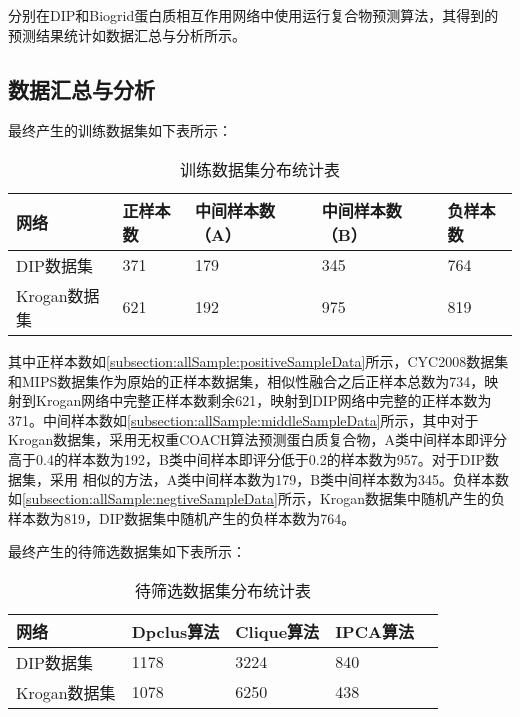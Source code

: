 分别在DIP和Biogrid蛋白质相互作用网络中使用运行复合物预测算法，其得到的预测结果统计如数据汇总与分析所示。




\subsection{数据汇总与分析}
\label{subsection:allSample:summary}

最终产生的训练数据集如下表所示：

\begin{table}[h]
    \centering
    \caption{训练数据集分布统计表}
    \label{tab:datasets:statistic:train}
    \begin{tabular}{C{3cm}C{2cm}C{3cm}C{3cm}C{2cm}}
        \toprule
        \textbf{网络} & \textbf{正样本数} & \textbf{中间样本数（A）} & \textbf{中间样本数（B）} & \textbf{负样本数} \\
        \midrule
        DIP数据集     & 371               & 179                      & 345                      & 764               \\
        Krogan数据集  & 621               & 192                      & 975                      & 819               \\

        \bottomrule
    \end{tabular}
\end{table}
其中正样本数如\ref{subsection:allSample:positiveSampleData}所示，CYC2008数据集和MIPS数据集作为原始的正样本数据集，相似性融合之后正样本总数为734，映射到Krogan网络中完整正样本数剩余621，映射到DIP网络中完整的正样本数为371。中间样本数如\ref{subsection:allSample:middleSampleData}所示，其中对于Krogan数据集，采用无权重COACH算法预测蛋白质复合物，A类中间样本即评分高于0.4的样本数为192，B类中间样本即评分低于0.2的样本数为957。对于DIP数据集，采用
相似的方法，A类中间样本数为179，B类中间样本数为345。负样本数如\ref{subsection:allSample:negtiveSampleData}所示，Krogan数据集中随机产生的负样本数为819，DIP数据集中随机产生的负样本数为764。

最终产生的待筛选数据集如下表所示：
\begin{table}[h]
    \centering
    \caption{待筛选数据集分布统计表}
    \label{tab:datasets:statistic:beselect}
    \begin{tabular}{C{3cm}C{2cm}C{3cm}C{3cm}C{2cm}}
        \toprule
        \textbf{网络} & \textbf{Dpclus算法} & \textbf{Clique算法} & \textbf{IPCA算法} \\
        \midrule
        DIP数据集  & 1178                & 3224                & 840               \\
        Krogan数据集     & 1078                & 6250                & 438               \\
        \bottomrule
    \end{tabular}
\end{table}

